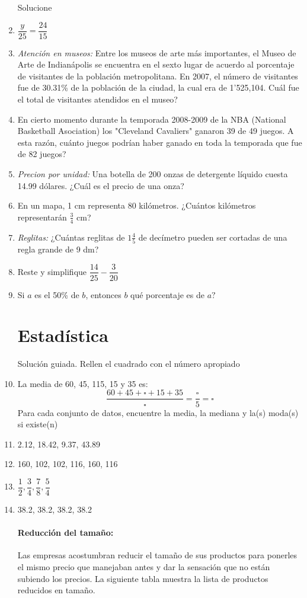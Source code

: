 \documentclass[twoside,letterpaper]{article}
\begin{document}
\begin{multicols}{2}
\begin{enumerate}
Solucione
\item $\dfrac{y}{25}=\dfrac{24}{15}$
\item \emph{Atención en museos:} Entre los museos de arte más importantes, el Museo de Arte de Indianápolis se encuentra en el sexto lugar de acuerdo al porcentaje de visitantes de la población metropolitana. En 2007, el número de visitantes fue de 30.31\% de la población de la ciudad, la cual era de 1'525,104. Cuál fue el total de visitantes atendidos en el museo?
\item En cierto momento durante la temporada 2008-2009 de la NBA (National Basketball Asociation) los "Cleveland Cavaliers" ganaron 39 de 49 juegos. A esta razón, cuánto juegos podrían haber ganado en toda la temporada que fue de 82 juegos?
\item \emph{Precion por unidad:} Una botella de 200 onzas de detergente líquido cuesta 14.99 dólares. ¿Cuál es el precio de una onza?
\item En un mapa, 1 cm representa 80 kilómetros. ¿Cuántos kilómetros representarán $\frac{3}{4}$ cm?
\item \emph{Reglitas:} ¿Cuántas reglitas de $1\frac{4}{5}$ de decímetro pueden ser cortadas de una regla grande de 9 dm?
\item Reste y simplifique $\dfrac{14}{25}-\dfrac{3}{20}$
\item Si $a$ es el 50\% de $b$, entonces $b$ qué porcentaje es de $a?$
\section*{Estadística}
Solución guiada. Rellen el cuadrado con el número apropiado
\item La media de 60, 45, 115, 15 y 35 es:
\[\dfrac{60+45+\square+15+35}{\square}=\dfrac{\square}{5}=\square\]
Para cada conjunto de datos, encuentre la media, la mediana y la(s) moda(s) si existe(n)
\item 2.12, 18.42, 9.37, 43.89
\item 160, 102, 102, 116, 160, 116
\item $\dfrac{1}{2}, \dfrac{3}{4}, \dfrac{7}{8}, \dfrac{5}{4}$
\item 38.2, 38.2, 38.2, 38.2
\paragraph*{Reducción del tamaño:} Las empresas acostumbran reducir el tamaño de sus productos para ponerles el mismo precio que manejaban antes y dar la sensación que no están subiendo los precios. La siguiente tabla muestra la lista de productos reducidos en tamaño.


\end{enumerate}
\end{multicols}
\end{document}
